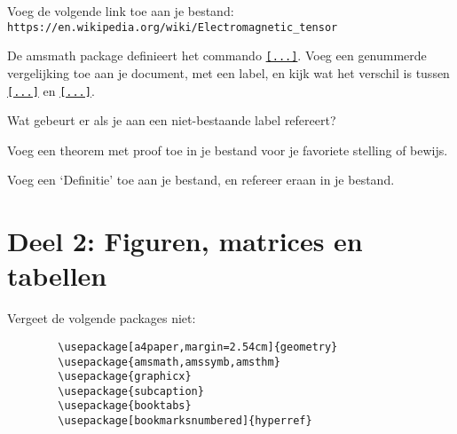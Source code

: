 \documentclass[a4paper]{article}
\begin{document}
    \begin{exercise}[URL's]
        Voeg de volgende link toe aan je bestand:\\
        \nolinkurl{https://en.wikipedia.org/wiki/Electromagnetic_tensor}
    \end{exercise}

    \begin{exercise}
        De amsmath package definieert het commando \texttt{\eqref{...}}.
        Voeg een genummerde vergelijking toe aan je document, met een label, en
        kijk wat het verschil is tussen \texttt{\ref{...}}
        en \texttt{\eqref{...}}.
    \end{exercise}

    \begin{exercise}[Labels]
        Wat gebeurt er als je aan een niet-bestaande label refereert?
    \end{exercise}

    \begin{exercise}
        Voeg een theorem met proof toe in je bestand voor je favoriete stelling of bewijs.
    \end{exercise}

    \begin{exercise}[Definitie]
        Voeg een `Definitie' toe aan je bestand, en refereer eraan in je bestand.
    \end{exercise}

    \section{Deel 2: Figuren, matrices en tabellen}

    Vergeet de volgende packages niet:
    \begin{verbatim}
        \usepackage[a4paper,margin=2.54cm]{geometry}
        \usepackage{amsmath,amssymb,amsthm}
        \usepackage{graphicx}
        \usepackage{subcaption}
        \usepackage{booktabs}
        \usepackage[bookmarksnumbered]{hyperref}
    \end{verbatim}
    \bigskip
\end{document}
